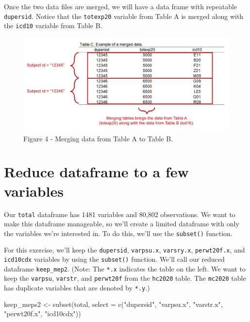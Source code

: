 \documentclass[
]{book}
\newenvironment{Shaded}{\begin{snugshade}}{\end{snugshade}}
\newcommand{\AttributeTok}[1]{\textcolor[rgb]{0.77,0.63,0.00}{#1}}
\newcommand{\FunctionTok}[1]{\textcolor[rgb]{0.00,0.00,0.00}{#1}}
\newcommand{\NormalTok}[1]{#1}
\newcommand{\OtherTok}[1]{\textcolor[rgb]{0.56,0.35,0.01}{#1}}
\newcommand{\StringTok}[1]{\textcolor[rgb]{0.31,0.60,0.02}{#1}}
\begin{document}
Once the two data files are merged, we will have a data frame with repeatable \texttt{dupersid}. Notice that the \texttt{totexp20} variable from Table A is merged along with the \texttt{icd10} variable from Table B.

\begin{figure}
\includegraphics[width=1\linewidth]{Figure 2_4} \caption{Figure 4 - Merging data from Table A to Table B.}\label{fig:unnamed-chunk-15}
\end{figure}

\hypertarget{reduce-dataframe-to-a-few-variables}{%
\section{Reduce dataframe to a few variables}\label{reduce-dataframe-to-a-few-variables}}

Our \texttt{total} dataframe has 1481 variables and 80,802 observations. We want to make this dataframe manageable, so we'll create a limited dataframe with only the variables we're interested in. To do this, we'll use the \texttt{subset()} function.

For this exercise, we'll keep the \texttt{dupersid}, \texttt{varpsu.x}, \texttt{varsry.x}, \texttt{perwt20f.x}, and \texttt{icd10cdx} variables by using the \texttt{subset()} function. We'll call our reduced dataframe \texttt{keep\_mep2}. (Note: The \texttt{*.x} indicates the table on the left. We want to keep the \texttt{varpsu}, \texttt{varstr}, and \texttt{perwt20f} from the \texttt{hc2020} table. The \texttt{mc2020} table has duplicate variables that are denoted by \texttt{*.y}.)

\begin{Shaded}
\begin{Highlighting}[]
\NormalTok{keep\_meps2 }\OtherTok{\textless{}{-}} \FunctionTok{subset}\NormalTok{(total, }\AttributeTok{select =} \FunctionTok{c}\NormalTok{(}\StringTok{"dupersid"}\NormalTok{, }\StringTok{"varpsu.x"}\NormalTok{, }\StringTok{"varstr.x"}\NormalTok{, }\StringTok{"perwt20f.x"}\NormalTok{, }\StringTok{"icd10cdx"}\NormalTok{))}
\end{Highlighting}
\end{Shaded}
\end{document}
